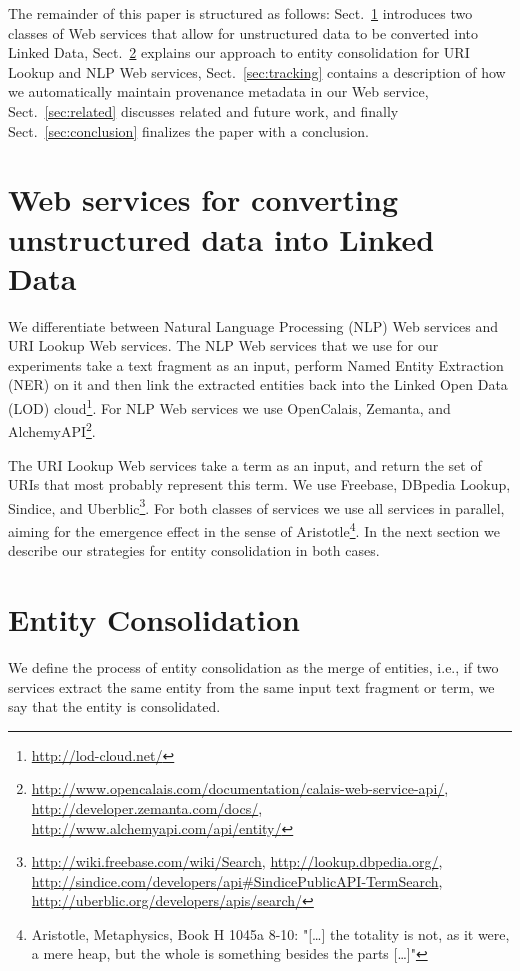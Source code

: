 \documentclass{acm_proc_article-sp}
\begin{document}
The remainder of this paper is structured as follows: Sect.~\ref{sec:services} introduces two classes of Web services that allow for unstructured data to be converted into Linked Data, Sect.~\ref{sec:consolidation} explains our approach to entity consolidation for URI Lookup and NLP Web services, Sect.~\ref{sec:tracking} contains a description of how we automatically maintain provenance metadata in our Web service, Sect.~\ref{sec:related} discusses related and future work, and finally Sect.~\ref{sec:conclusion} finalizes the paper with a conclusion.

\section{Web services for converting unstructured data into Linked Data}\label{sec:services}
We differentiate between Natural Language Processing (NLP) Web services and URI Lookup Web services. The NLP Web services that we use for our experiments take a text fragment as an input, perform Named Entity Extraction (NER) on it and then link the extracted entities back into the Linked Open Data (LOD) cloud\footnote{\url{http://lod-cloud.net/}}. For NLP Web services we use OpenCalais, Zemanta, and AlchemyAPI\footnote{\url{http://www.opencalais.com/documentation/calais-web-service-api/}, \url{http://developer.zemanta.com/docs/}, \url{http://www.alchemyapi.com/api/entity/}}.

The URI Lookup Web services take a term as an input, and return the set of URIs that most probably represent this term. We use Freebase, DBpedia Lookup, Sindice, and Uberblic\footnote{\url{http://wiki.freebase.com/wiki/Search}, \url{http://lookup.dbpedia.org/}, \url{http://sindice.com/developers/api#SindicePublicAPI-TermSearch}, \url{http://uberblic.org/developers/apis/search/}}. For both classes of services we use all services in parallel, aiming for the emergence effect in the sense of Aristotle\footnote{Aristotle, Metaphysics, Book H 1045a 8-10: "[\ldots] the totality is not, as it were, a mere heap, but the whole is something besides the parts [\ldots]"}. In the next section we describe our strategies for entity consolidation in both cases. 

\section{Entity Consolidation}\label{sec:consolidation}
We define the process of entity consolidation as the merge of entities, i.e., if two services extract the same entity from the same input text fragment or term, we say that the entity is consolidated.
\end{document}
